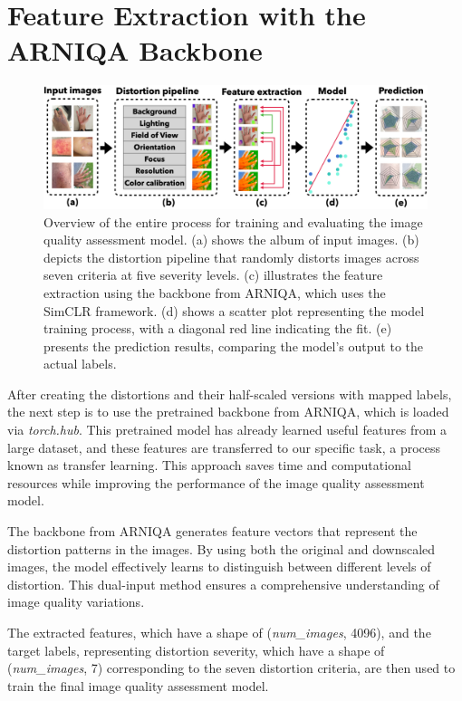 \section{Feature Extraction with the ARNIQA Backbone}
\label{sec:FeatureExtraction}
\begin{figure}[ht]
    \centering
    \includegraphics[keepaspectratio,width=15cm]{img/Architecture.png}
    \caption{Overview of the entire process for training and evaluating the image quality assessment model. (a) shows the album of input images. (b) depicts the distortion pipeline that randomly distorts images across seven criteria at five severity levels. (c) illustrates the feature extraction using the backbone from ARNIQA, which uses the SimCLR framework. (d) shows a scatter plot representing the model training process, with a diagonal red line indicating the fit. (e) presents the prediction results, comparing the model’s output to the actual labels.}
    \label{fig:Architecture}
\end{figure}

After creating the distortions and their half-scaled versions with mapped labels, the next step is to use the pretrained backbone from ARNIQA, which is loaded via \textit{torch.hub}. This pretrained model has already learned useful features from a large dataset, and these features are transferred to our specific task, a process known as transfer learning. This approach saves time and computational resources while improving the performance of the image quality assessment model. \par
\vspace{\baselineskip}
\noindent
The backbone from ARNIQA generates feature vectors that represent the distortion patterns in the images. By using both the original and downscaled images, the model effectively learns to distinguish between different levels of distortion. This dual-input method ensures a comprehensive understanding of image quality variations. \par
\vspace{\baselineskip}
\noindent
The extracted features, which have a shape of (\textit{num\_images}, 4096), and the target labels, representing distortion severity, which have a shape of (\textit{num\_images}, 7) corresponding to the seven distortion criteria, are then used to train the final image quality assessment model. \par

